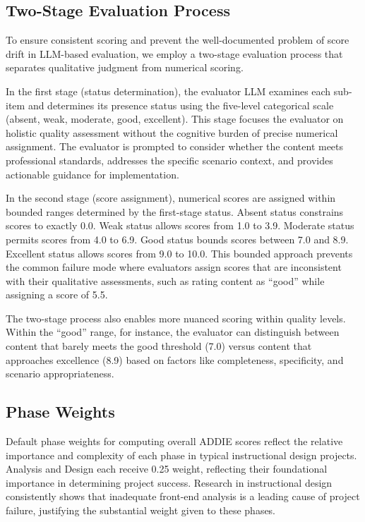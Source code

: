 \subsection{Two-Stage Evaluation Process}

To ensure consistent scoring and prevent the well-documented problem of score drift in LLM-based evaluation, we employ a two-stage evaluation process that separates qualitative judgment from numerical scoring.

In the first stage (status determination), the evaluator LLM examines each sub-item and determines its presence status using the five-level categorical scale (absent, weak, moderate, good, excellent). This stage focuses the evaluator on holistic quality assessment without the cognitive burden of precise numerical assignment. The evaluator is prompted to consider whether the content meets professional standards, addresses the specific scenario context, and provides actionable guidance for implementation.

In the second stage (score assignment), numerical scores are assigned within bounded ranges determined by the first-stage status. Absent status constrains scores to exactly 0.0. Weak status allows scores from 1.0 to 3.9. Moderate status permits scores from 4.0 to 6.9. Good status bounds scores between 7.0 and 8.9. Excellent status allows scores from 9.0 to 10.0. This bounded approach prevents the common failure mode where evaluators assign scores that are inconsistent with their qualitative assessments, such as rating content as ``good'' while assigning a score of 5.5.

The two-stage process also enables more nuanced scoring within quality levels. Within the ``good'' range, for instance, the evaluator can distinguish between content that barely meets the good threshold (7.0) versus content that approaches excellence (8.9) based on factors like completeness, specificity, and scenario appropriateness.

\subsection{Phase Weights}

Default phase weights for computing overall ADDIE scores reflect the relative importance and complexity of each phase in typical instructional design projects. Analysis and Design each receive 0.25 weight, reflecting their foundational importance in determining project success. Research in instructional design consistently shows that inadequate front-end analysis is a leading cause of project failure, justifying the substantial weight given to these phases.

